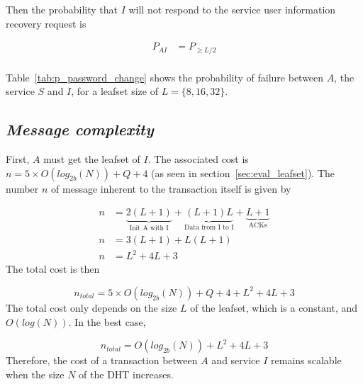 
    Then the probability that $I$ will not respond to the service user
information recovery request is

    \begin{align}
      P_{AI} &= P_{\ge L/2} \\
    \end{align}


    Table~\eqref{tab:p_password_change} shows the probability of failure
between $A$, the service $S$ and $I$, for a leafset size of $L = \{8,16,32\}$.

  \subsection{\textit{Message complexity}}
    First, $A$ must get the leafset of $I$. The associated cost is $n = 5
\times O(log_{2b}(N)) + Q + 4$ (as seen in section~\ref{sec:eval_leafset}).
    The number $n$ of message inherent to the transaction itself is given by

    \begin{align}
      n &= \underbrace{2(L+1)}_\text{Init A with I} +
           \underbrace{(L+1)L}_\text{Data from I to I} +
           \underbrace{L+1}_\text{ACKs}\\
      n &= 3(L+1) + L(L+1)\\
      n &= L^2 + 4L + 3
    \end{align}
     The total cost is then

    $$
      n_{total} = 5 \times O(log_{2b}(N)) + Q + 4 +  L^2 + 4L + 3
    $$    
    The total cost only depends on the size $L$ of the leafset, which is a
constant, and $O(log(N))$. In the best case, 

    $$
      n_{total} = O(log_{2b}(N)) + L^2 + 4L + 3
    $$
    Therefore, the cost of a transaction between $A$ and service $I$ remains
scalable when the size $N$ of the DHT increases.

